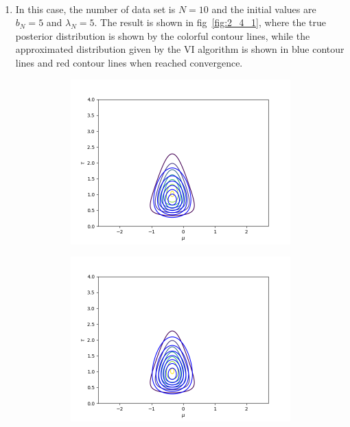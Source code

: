 \documentclass[11pt]{extarticle}
\newcommand{\0}{\mathbf{0}}
\renewcommand{\(}{\left(}
\renewcommand{\)}{\right)}
\theoremstyle{definition}
\begin{document}
\noindent{} \\
\begin{enumerate}
	\item In this case, the number of data set is $N = 10$ and the initial values are $b_{N} = 5$ and $\lambda_{N} = 5$. The result is shown in fig~\ref{fig:2_4_1}, where the true posterior distribution is shown by the colorful contour lines, while the approximated distribution given by the VI algorithm is shown in blue contour lines and red contour lines when reached convergence.
	\begin{figure}[!ht]
		\centering
		\begin{subfigure}{.45\textwidth}
			\includegraphics[width=\linewidth]{2_4_1_1}
		\end{subfigure}
		\begin{subfigure}{.45\textwidth}
			\includegraphics[width=\linewidth]{2_4_1_2}

\end{subfigure}
\end{figure}
\end{enumerate}
\end{document}

